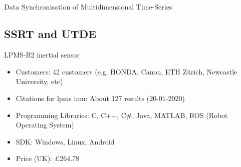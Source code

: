 \subsection{}
{

\begin{frame}{Data Synchronisation of Multidimensional Time-Series}
    \begin{figure}
   \end{figure}
\vspace{-5mm}


\end{frame}
}


\subsection{SSRT and UTDE}
{

\begin{frame}{LPMS-B2 inertial sensor }


    \begin{figure}
   \end{figure}
\vspace{-5mm}


\begin{itemize}
\item Customers: 42 customers (e.g. HONDA, Canon, 
ETH Zürich, Newcastle University, etc) %
\item Citations for lpms imu: About 127 results (20-01-2020) %
\item Programming Libraries: C, C++, C#, Java, MATLAB, ROS (Robot Operating System) %
\item SDK: 	Windows, Linux, Android %
\item Price (UK): £264.78
\end{itemize}

\end{frame}
}




